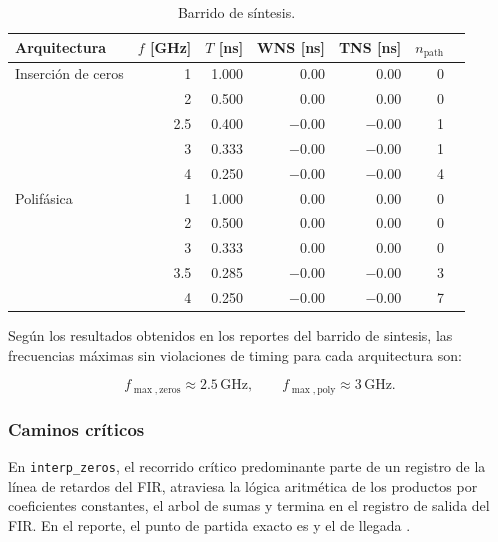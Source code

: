 \documentclass[10pt,a4paper]{article}
\begin{document}
\begin{table}[H]
    \centering
    \caption{Barrido de síntesis.}
    \label{tab:barrido-timing}
    \small
    \begin{tabular}{@{}lrrrrrr@{}}
        \toprule
        \textbf{Arquitectura} & $f$ [GHz] & $T$ [ns] &
        WNS [ns] & TNS [ns] & $n_{\mathrm{path}}$ \\
        \midrule
        Inserción de ceros & 1  & 1.000 & $0.00$  & $0.00$  & 0 \\
                          & 2   & 0.500 & $0.00$  & $0.00$  & 0 \\
                          & 2.5 & 0.400 & $-0.00$ & $-0.00$ & 1 \\
                          & 3   & 0.333 & $-0.00$ & $-0.00$ & 1 \\
                          & 4   & 0.250 & $-0.00$ & $-0.00$ & 4 \\
        \midrule
        Polifásica        & 1   & 1.000 & $0.00$  & $0.00$  & 0 \\
                          & 2   & 0.500 & $0.00$  & $0.00$  & 0 \\
                          & 3   & 0.333 & $0.00$  & $0.00$  & 0 \\
                          & 3.5 & 0.285 & $-0.00$ & $-0.00$ & 3 \\
                          & 4   & 0.250 & $-0.00$ & $-0.00$ & 7 \\
        \bottomrule
    \end{tabular}
\end{table}

Según los resultados obtenidos en los reportes del barrido de sintesis, las frecuencias
máximas sin violaciones de timing para cada arquitectura son:

\begin{equation}
f_{\max,\mathrm{zeros}}\approx 2.5\,\mathrm{GHz},
\qquad
f_{\max,\mathrm{poly}}\approx 3\,\mathrm{GHz}.
\label{eq:fmax-aproximadas}
\end{equation}

\subsubsection*{Caminos críticos}

En \texttt{interp\_zeros}, el recorrido crítico predominante parte de un registro
de la línea de retardos del FIR, atraviesa la lógica aritmética de los productos
por coeficientes constantes, el arbol de sumas y termina en el registro de salida
del FIR. En el reporte, el punto de partida exacto es  y
el de llegada .
\end{document}
